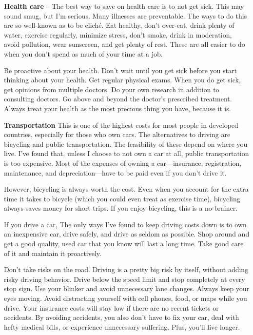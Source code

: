 \textbf{Health care} -- The best way to save on health care is to not get sick. This may sound smug, but I'm serious. Many illnesses are preventable. The ways to do this are so well-known as to be clich\'e. Eat healthy, don't over-eat, drink plenty of water, exercise regularly, minimize stress, don't smoke, drink in moderation, avoid pollution, wear sunscreen, and get plenty of rest. These are all easier to do when you don't spend as much of your time at a job.

Be proactive about your health. Don't wait until you get sick before you start thinking about your health. Get regular physical exams. When you do get sick, get opinions from multiple doctors. Do your own research in addition to consulting doctors. Go above and beyond the doctor's prescribed treatment. Always treat your health as the most precious thing you have, because it is.

\textbf{Transportation}
This is one of the highest costs for most people in developed countries, especially for those who own cars. The alternatives to driving are bicycling and public transportation. The feasibility of these depend on where you live. I've found that, unless I choose to not own a car at all, public transportation is too expensive. Most of the expenses of owning a car---insurance, registration, maintenance, and depreciation---have to be paid even if you don't drive it.

However, bicycling is always worth the cost. Even when you account for the extra time it takes to bicycle (which you could even treat as exercise time), bicycling always saves money for short trips. If you enjoy bicycling, this is a no-brainer.

If you drive a car, The only ways I've found to keep driving costs down is to own an inexpensive car, drive safely, and drive as seldom as possible. Shop around and get a good quality, used car that you know will last a long time. Take good care of it and maintain it proactively.

Don't take risks on the road. Driving is a pretty big risk by itself, without adding risky driving behavior. Drive below the speed limit and stop completely at every stop sign. Use your blinker and avoid unnecessary lane changes. Always keep your eyes moving. Avoid distracting yourself with cell phones, food, or maps while you drive. Your insurance costs will stay low if there are no recent tickets or accidents. By avoiding accidents, you also don't have to fix your car, deal with hefty medical bills, or experience unnecessary suffering. Plus, you'll live longer.

